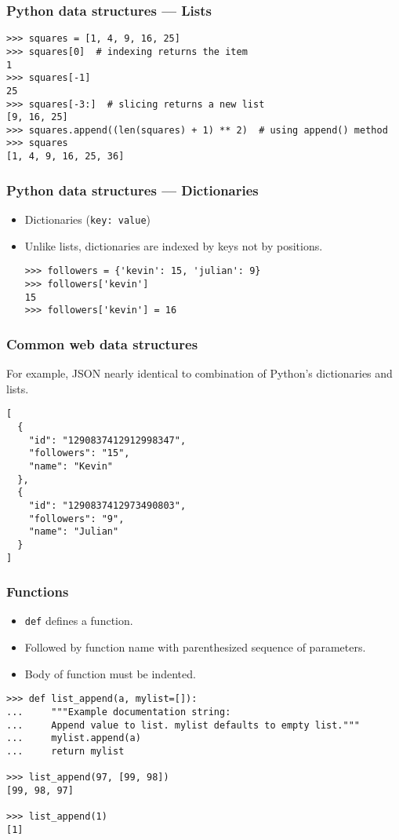 \begin{frame}[fragile]
    \frametitle{Python data structures --- Lists}
\begin{verbatim}
>>> squares = [1, 4, 9, 16, 25]
>>> squares[0]  # indexing returns the item
1
>>> squares[-1]
25
>>> squares[-3:]  # slicing returns a new list
[9, 16, 25]
>>> squares.append((len(squares) + 1) ** 2)  # using append() method
>>> squares
[1, 4, 9, 16, 25, 36]
\end{verbatim}
\end{frame}

\begin{frame}[fragile]
    \frametitle{Python data structures --- Dictionaries}
    \begin{itemize}
        \item Dictionaries (\texttt{key: value})\\
        \item Unlike lists, dictionaries are indexed by keys not by positions.
\begin{verbatim}
>>> followers = {'kevin': 15, 'julian': 9}
>>> followers['kevin']
15
>>> followers['kevin'] = 16
\end{verbatim}
    \end{itemize}
\end{frame}

\begin{frame}[fragile]
    \frametitle{Common web data structures}
        For example, JSON nearly identical to combination of Python's dictionaries and lists.
\begin{verbatim}
[
  {
    "id": "1290837412912998347",
    "followers": "15",
    "name": "Kevin"
  },
  {
    "id": "1290837412973490803",
    "followers": "9",
    "name": "Julian"
  }
]
\end{verbatim}
\end{frame}

\begin{frame}[fragile]
    \frametitle{Functions}
    \begin{itemize}
        \item  \texttt{def} defines a function.
        \item Followed by function name with parenthesized sequence of parameters.
        \item Body of function must be indented.
    \end{itemize}
\begin{verbatim}
>>> def list_append(a, mylist=[]):
...     """Example documentation string:
...     Append value to list. mylist defaults to empty list."""
...     mylist.append(a)
...     return mylist

>>> list_append(97, [99, 98])
[99, 98, 97]

>>> list_append(1)
[1]
\end{verbatim}
\end{frame}

